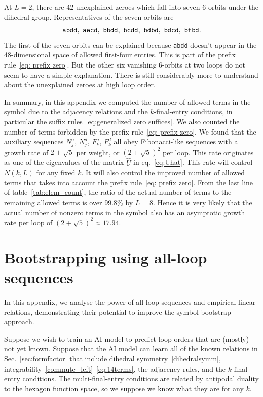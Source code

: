 \documentclass[12pt]{article}
\begin{document}
At $L=2$, there are 42 unexplained zeroes which fall into seven 6-orbits under the dihedral group.  Representatives of the seven orbits are
%
\begin{equation}
{\tt abdd},\ {\tt aecd},\ {\tt bbdd},\ {\tt bcdd},\ 
{\tt bdbd},\ {\tt bdcd},\ {\tt bfbd}.
\end{equation}
%
The first of the seven orbits can be explained because {\tt abdd} doesn't appear in the 48-dimensional space of allowed first-four entries. This is part of the prefix rule~\eqref{eq: prefix zero}.  But the other six vanishing 6-orbits at two loops do not seem to have a simple explanation.  There is still considerably more to understand about the unexplained zeroes at high loop order.

In summary, in this appendix we computed the number of allowed terms in the symbol due to the adjacency relations and the $k$-final-entry conditions, in particular the suffix rules~\eqref{eq:generalized zero suffices}.  We also counted the number of terms forbidden by the prefix rule~\eqref{eq: prefix zero}.  We found that the auxiliary sequences $N_j^a$, $N_j^d$, $F_k^a$, $F_k^d$ all obey Fibonacci-like sequences with a growth rate of $2+\sqrt{5}$ per weight, or $(2+\sqrt{5})^2$ per loop. This rate originates as one of the eigenvalues of the matrix $\hat{U}$ in eq.~\eqref{eq:Uhat}. This rate will control $N(k,L)$ for any fixed $k$.  It will also control the improved number of allowed terms that takes into account the prefix rule~\eqref{eq: prefix zero}. From the last line of table~\ref{tab:elem_count}, the ratio of the actual number of terms to the remaining allowed terms is over 99.8\% by $L=8$. Hence it is very likely that the actual number of nonzero terms in the symbol also has an asymptotic growth rate per loop of $(2+\sqrt{5})^2\approx 17.94$.



\section{Bootstrapping using all-loop sequences}
\label{app: bootstrapping}

In this appendix, we analyse the power of all-loop sequences and empirical linear relations, demonstrating their potential to improve the symbol bootstrap approach.

Suppose we wish to train an AI model to predict loop orders that are (mostly) not yet known.  Suppose that the AI model can learn all of the known relations in 
Sec.~\ref{sec:formfactor} that include dihedral symmetry~\eqref{dihedralsymm}, integrability~\eqref{commute_left}--\eqref{eq:14terms}, the adjacency rules, and the $k$-final-entry conditions.  The multi-final-entry conditions are related by antipodal duality to the hexagon function space, so we suppose we know what they are for any $k$. 
\end{document}
